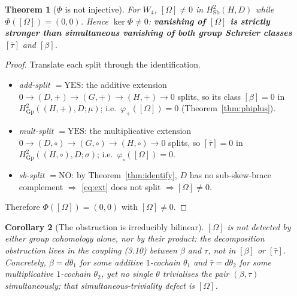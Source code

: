 \documentclass[11pt]{article}
\newtheorem{theorem}{Theorem}
\newtheorem{corollary}[theorem]{Corollary}
\theoremstyle{definition}
\newcommand{\Sb}{\mathrm{Sb}}
\newcommand{\Gp}{\mathrm{Gp}}
\begin{document}
\begin{theorem}[$\Phi$ is not injective]\label{thm:W4}
For $W_4$, $[\Omega]\neq0$ in $H^2_\Sb(H,D)$ while $\Phi([\Omega])=(0,0)$. Hence $\ker\Phi\neq0$:
\textbf{vanishing of $[\Omega]$ is strictly stronger than simultaneous vanishing of both group
Schreier classes} $[\bar\tau]$ and $[\beta]$.
\end{theorem}

\begin{proof}
Translate each split through the identification.
\begin{itemize}\itemsep2pt
\item \emph{add-split $=\mathrm{YES}$}: the additive extension $0\to(D,+)\to(G,+)\to(H,+)\to0$
splits, so its class $[\beta]=0$ in $H^2_\Gp((H,+),D;\mu)$; i.e.\ $\varphi_+([\Omega])=0$
(Theorem~\ref{thm:phiplus}).
\item \emph{mult-split $=\mathrm{YES}$}: the multiplicative extension
$0\to(D,\circ)\to(G,\circ)\to(H,\circ)\to0$ splits, so $[\bar\tau]=0$ in
$H^2_\Gp((H,\circ),D;\sigma)$; i.e.\ $\varphi_\circ([\Omega])=0$.
\item \emph{sb-split $=\mathrm{NO}$}: by Theorem~\ref{thm:identify}, $D$ has no sub-skew-brace
complement $\Rightarrow$ \eqref{eq:ext} does not split $\Rightarrow[\Omega]\neq0$.
\end{itemize}
Therefore $\Phi([\Omega])=(0,0)$ with $[\Omega]\neq0$.
\end{proof}

\begin{corollary}[The obstruction is irreducibly bilinear]
$[\Omega]$ is not detected by either group cohomology alone, nor by their product: the
decomposition obstruction lives in the \emph{coupling} (3.10) between $\beta$ and $\tau$, not in
$[\beta]$ or $[\bar\tau]$. Concretely, $\beta=d\theta_1$ for some additive $1$-cochain
$\theta_1$ and $\bar\tau=d\theta_2$ for some multiplicative $1$-cochain $\theta_2$, yet
\emph{no single} $\theta$ trivialises the pair $(\beta,\tau)$ simultaneously; that
simultaneous-triviality defect is $[\Omega]$.
\end{corollary}
\end{document}
